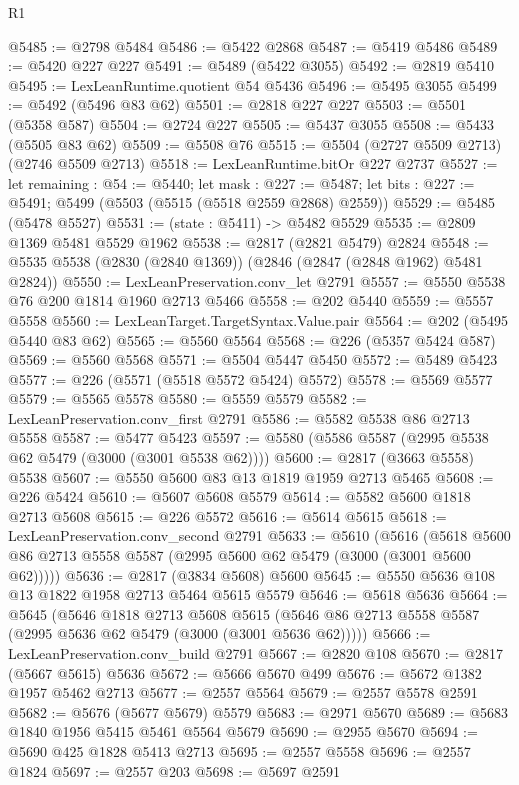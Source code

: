\begin{lexlean}{R1}
\begin{coremodule}
@5485 := @2798 @5484
@5486 := @5422 @2868
@5487 := @5419 @5486
@5489 := @5420 @227 @227
@5491 := @5489 (@5422 @3055)
@5492 := @2819 @5410
@5495 := LexLeanRuntime.quotient @54 @5436
@5496 := @5495 @3055
@5499 := @5492 (@5496 @83 @62)
@5501 := @2818 @227 @227
@5503 := @5501 (@5358 @587)
@5504 := @2724 @227
@5505 := @5437 @3055
@5508 := @5433 (@5505 @83 @62)
@5509 := @5508 @76
@5515 := @5504 (@2727 @5509 @2713) (@2746 @5509 @2713)
@5518 := LexLeanRuntime.bitOr @227 @2737
@5527 := let remaining : @54 := @5440;
  let mask : @227 := @5487;
  let bits : @227 := @5491; @5499 (@5503 (@5515 (@5518 @2559 @2868) @2559))
@5529 := @5485 (@5478 @5527)
@5531 := (state : @5411) -> @5482 @5529
@5535 := @2809 @1369 @5481 @5529 @1962
@5538 := @2817 (@2821 @5479) @2824
@5548 := @5535 @5538 (@2830 (@2840 @1369)) (@2846 (@2847 (@2848 @1962) @5481 @2824))
@5550 := LexLeanPreservation.conv_let @2791
@5557 := @5550 @5538 @76 @200 @1814 @1960 @2713 @5466
@5558 := @202 @5440
@5559 := @5557 @5558
@5560 := LexLeanTarget.TargetSyntax.Value.pair
@5564 := @202 (@5495 @5440 @83 @62)
@5565 := @5560 @5564
@5568 := @226 (@5357 @5424 @587)
@5569 := @5560 @5568
@5571 := @5504 @5447 @5450
@5572 := @5489 @5423
@5577 := @226 (@5571 (@5518 @5572 @5424) @5572)
@5578 := @5569 @5577
@5579 := @5565 @5578
@5580 := @5559 @5579
@5582 := LexLeanPreservation.conv_first @2791
@5586 := @5582 @5538 @86 @2713 @5558
@5587 := @5477 @5423
@5597 := @5580 (@5586 @5587 (@2995 @5538 @62 @5479 (@3000 (@3001 @5538 @62))))
@5600 := @2817 (@3663 @5558) @5538
@5607 := @5550 @5600 @83 @13 @1819 @1959 @2713 @5465
@5608 := @226 @5424
@5610 := @5607 @5608 @5579
@5614 := @5582 @5600 @1818 @2713 @5608
@5615 := @226 @5572
@5616 := @5614 @5615
@5618 := LexLeanPreservation.conv_second @2791
@5633 := @5610
    (@5616 (@5618 @5600 @86 @2713 @5558 @5587 (@2995 @5600 @62 @5479 (@3000 (@3001 @5600 @62)))))
@5636 := @2817 (@3834 @5608) @5600
@5645 := @5550 @5636 @108 @13 @1822 @1958 @2713 @5464 @5615 @5579
@5646 := @5618 @5636
@5664 := @5645
    (@5646
      @1818
      @2713
      @5608
      @5615
      (@5646 @86 @2713 @5558 @5587 (@2995 @5636 @62 @5479 (@3000 (@3001 @5636 @62)))))
@5666 := LexLeanPreservation.conv_build @2791
@5667 := @2820 @108
@5670 := @2817 (@5667 @5615) @5636
@5672 := @5666 @5670 @499
@5676 := @5672 @1382 @1957 @5462 @2713
@5677 := @2557 @5564
@5679 := @2557 @5578 @2591
@5682 := @5676 (@5677 @5679) @5579
@5683 := @2971 @5670
@5689 := @5683 @1840 @1956 @5415 @5461 @5564 @5679
@5690 := @2955 @5670
@5694 := @5690 @425 @1828 @5413 @2713
@5695 := @2557 @5558
@5696 := @2557 @1824
@5697 := @2557 @203
@5698 := @5697 @2591

\end{coremodule}
\end{lexlean}
